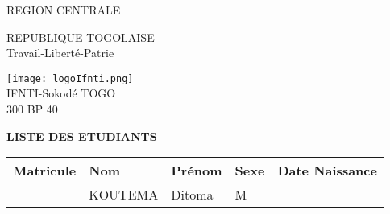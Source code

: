 \documentclass[10pt,a4paper]{article}
\begin{document}
\begin{minipage}{12cm}
\textsf{REGION CENTRALE} \\ \hspace{1cm}
\end{minipage}
\begin{minipage}{5cm}
REPUBLIQUE TOGOLAISE\\
Travail-Liberté-Patrie
\end{minipage}
\begin{minipage}{3cm}
\begin{center}
\texttt{[image: logoIfnti.png]} \\ \hspace{1cm}
IFNTI-Sokodé TOGO\\300 BP 40
\end{center}
\end{minipage}
\begin{center}
\underline{\textbf{LISTE DES ETUDIANTS}}
\end{center}
\begin{longtable}{|l|l|l|l|l|} \hline
\textbf{Matricule} & \textbf{Nom} & \textbf{Prénom} &
\textbf{Sexe} & \textbf{Date Naissance}\\ \hline

 & KOUTEMA & Ditoma &
M & \\ \hline

\end{longtable}
\end{document}
